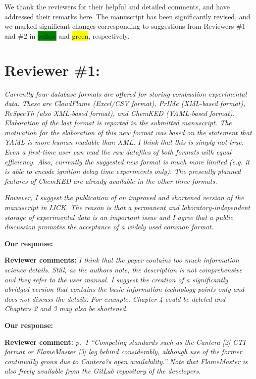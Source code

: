 \documentclass[a4paper,10pt]{elsarticle}
\providecommand{\hly}[1]{\colorbox{yellow}{#1}}
\providecommand{\hlg}[1]{\colorbox{green}{#1}}
\begin{document}
We thank the reviewers for their helpful and detailed comments, and have addressed their remarks here.
The manuscript has been significantly revised, and we marked significant changes corresponding to suggestions from Reviewers \#1 and \#2 in \hlg{yellow} and \hly{green}, respectively.


\section*{Reviewer \#1:}

\textit{Currently four database formats are offered for storing combustion experimental data. These are CloudFlame (Excel/CSV format), PrIMe (XML-based format), ReSpecTh (also XML-based format), and ChemKED (YAML-based format). Elaboration of the last format is reported in the submitted manuscript. The motivation for the elaboration of this new format was based on the statement that YAML is more human readable than XML. I think that this is simply not true. Even a first-time user can read the raw datafiles of both formats with equal efficiency. Also, currently the suggested new format is much more limited (e.g. it is able to encode ignition delay time experiments only). The presently planned features of ChemKED are already available in the other three formats.}

\textit{However, I suggest the publication of an improved and shortened version of the manuscript in IJCK. The reason is that a permanent and laboratory-independent storage of experimental data is an important issue and I agree that a public discussion promotes the acceptance of a widely used common format.}

\textbf{Our response:}



\textbf{Reviewer comments:}
\textit{I think that the paper contains too much information science details. Still, as the authors note, the description is not comprehensive and they refer to the user manual. I suggest the creation of a significantly abridged version that contains the basic information technology points only and does not discuss the details. For example, Chapter 4 could be deleted and Chapters 2 and 3 may also be shortened.}

\textbf{Our response:}



\textbf{Reviewer comment:}
\textit{p.~1 ``Competing standards such as the Cantera [2] CTI format or FlameMaster [3] lag behind considerably, although use of the former continually grows due to Cantera?s open availability.''
Note that FlameMaster is also freely available from the GitLab repository of the developers.}
\end{document}
